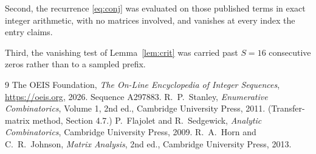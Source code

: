 \documentclass[11pt,a4paper]{article}
\theoremstyle{plain}
\theoremstyle{definition}
\begin{document}
Second, the recurrence \eqref{eq:conj} was evaluated on those published terms in exact
integer arithmetic, with no matrices involved, and vanishes at every index the entry claims.

Third, the vanishing test of Lemma~\ref{lem:crit} was carried past $S=16$ consecutive
zeros rather than to a sampled prefix.

\begin{thebibliography}{9}
 The OEIS Foundation, \emph{The On-Line Encyclopedia of Integer
Sequences}, \url{https://oeis.org}, 2026. Sequence A297883.
 R.~P.~Stanley, \emph{Enumerative Combinatorics}, Volume 1, 2nd ed.,
Cambridge University Press, 2011. (Transfer-matrix method, Section 4.7.)
 P.~Flajolet and R.~Sedgewick, \emph{Analytic Combinatorics}, Cambridge
University Press, 2009.
 R.~A.~Horn and C.~R.~Johnson, \emph{Matrix Analysis}, 2nd ed., Cambridge
University Press, 2013.
\end{thebibliography}
\end{document}
